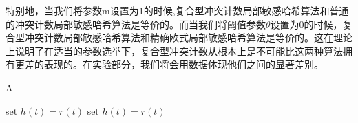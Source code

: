 特别地，当我们将参数m设置为1的时候,复合型冲突计数局部敏感哈希算法和普通的冲突计数局部敏感哈希算法是等价的。而当我们将阈值参数$ \theta $设置为0的时候，复合型冲突计数局部敏感哈希算法和精确欧式局部敏感哈希算法是等价的。这在理论上说明了在适当的参数选举下，复合型冲突计数从根本上是不可能比这两种算法拥有更差的表现的。在实验部分，我们将会用数据体现他们之间的显著差别。


\begin{algorithm}
	\caption{A}
	\label{alg:A}
	\begin{algorithmic}
		\REPEAT 
		\STATE set $h(t)=r(t)$ 
		\REPEAT
		\STATE set $h(t)=r(t)$ 
	\end{algorithmic}
\end{algorithm}













